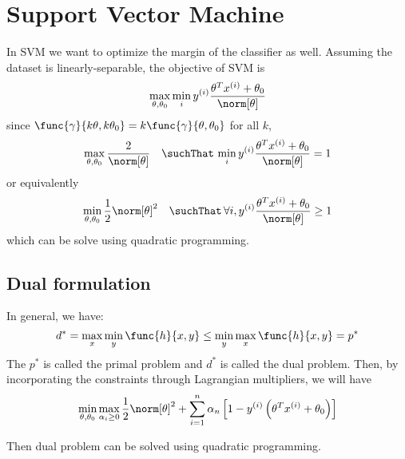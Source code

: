 \chapter{Support Vector Machine}
In SVM we want to optimize the margin of the classifier as well. Assuming the dataset is linearly-separable, the objective of SVM is 
\begin{equation*}
    \max_{\theta, \theta_0} \min_{i} y^{(i)} \dfrac{\theta^T x^{(i)} + \theta_0}{\norm[\theta]}
\end{equation*}
since \(\func{\gamma}{k \theta, k \theta_0} = k \func{\gamma}{\theta, \theta_0}\) for all \(k\),
\begin{equation*}
    \max_{\theta, \theta_0} \dfrac{2}{\norm[\theta]}  \quad \suchThat \, \min_{i} y^{(i)} \dfrac{\theta^T x^{(i)} + \theta_0}{\norm[\theta]} = 1
\end{equation*}
or equivalently 
\begin{equation*}
    \min_{\theta, \theta_0} \dfrac{1}{2}\norm[\theta]^2  \quad \suchThat \, \forall i, y^{(i)} \dfrac{\theta^T x^{(i)} + \theta_0}{\norm[\theta]} \geq 1 
\end{equation*}
which can be solve using quadratic programming.

\section{Dual formulation}
In general, we have: 
\begin{equation*}
    d^{\ast} = \max_x \min_y \func{h}{x,y} \leq \min_y \max_x \func{h}{x,y} = p^{\ast}
\end{equation*}
The \(p^{\ast}\) is called the primal problem and \(d^{\ast}\) is called the dual problem. Then, by incorporating the constraints through Lagrangian multipliers, we will have 
\begin{equation*}
    \min_{\theta, \theta_0} \max_{\alpha_i \geq 0} \dfrac{1}{2} \norm[\theta]^2 + \sum_{i = 1}^n \alpha_n \left[ 1 - y^{(i)} \left( \theta^T x^{(i)} + \theta_0 \right) \right]
\end{equation*}

Then dual problem can be solved using quadratic programming.